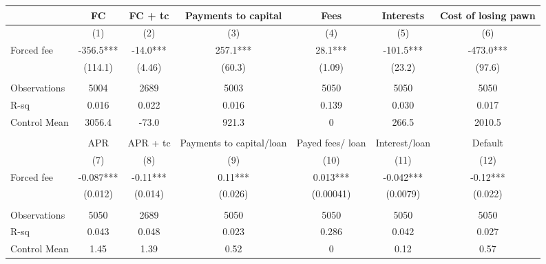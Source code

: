 \begin{tabular}{lcccccc}
\toprule
      & FC    & FC + tc & Payments to capital & Fees  & Interests & Cost of losing pawn \\
\midrule
      & (1)   & (2)   & (3)   & (4)   & (5)   & (6) \\
\midrule
\midrule
Forced fee & -356.5*** & -14.0*** & 257.1*** & 28.1*** & -101.5*** & -473.0*** \\
      & (114.1) & (4.46) & (60.3) & (1.09) & (23.2) & (97.6) \\
      &       &       &       &       &       &  \\
\midrule
Observations  & 5004  & 2689  & 5003  & 5050  & 5050  & 5050 \\
R-sq  & 0.016 & 0.022 & 0.016 & 0.139 & 0.030 & 0.017 \\
Control Mean & 3056.4 & -73.0 & 921.3 & 0     & 266.5 & 2010.5 \\
\midrule
\midrule
      &       &       &       &       &       &  \\
\midrule
      & APR   & APR + tc & Payments to capital/loan & Payed fees/ loan & Interest/loan & Default \\
\midrule
      & (7)   & (8)   & (9)   & (10)  & (11)  & (12) \\
\midrule
\midrule
Forced fee & -0.087*** & -0.11*** & 0.11*** & 0.013*** & -0.042*** & -0.12*** \\
      & (0.012) & (0.014) & (0.026) & (0.00041) & (0.0079) & (0.022) \\
      &       &       &       &       &       &  \\
\midrule
Observations  & 5050  & 2689  & 5050  & 5050  & 5050  & 5050 \\
R-sq  & 0.043 & 0.048 & 0.023 & 0.286 & 0.042 & 0.027 \\
Control Mean & 1.45  & 1.39  & 0.52  & 0     & 0.12  & 0.57 \\
\bottomrule
\bottomrule
\end{tabular}%
